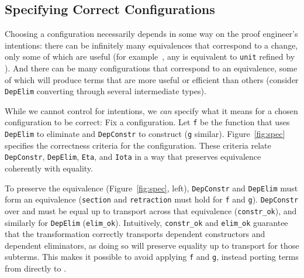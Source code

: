 \subsection{Specifying Correct Configurations}
\label{sec:art}


Choosing a configuration necessarily depends in some way on the proof engineer's intentions:
there can be infinitely many equivalences that correspond to a 
change, only some of which are useful (for example~, any \A is equivalent to \lstinline{unit} refined by \A). %
And there can be many configurations that correspond
to an equivalence, some of which will produce terms that are more useful or efficient than others
(consider \lstinline{DepElim} converting through several intermediate types).

While we cannot control for intentions, we \textit{can} specify what it means for a chosen configuration to be correct:
Fix a configuration. Let \lstinline{f} be the function that uses \lstinline{DepElim} to eliminate \A and \lstinline{DepConstr} to construct \B (\lstinline{g} similar). %
Figure~\ref{fig:spec} specifies the correctness criteria for the configuration.
These criteria relate \lstinline{DepConstr}, \lstinline{DepElim}, \lstinline{Eta}, and \lstinline{Iota}
in a way that preserves equivalence coherently with equality.

To preserve the equivalence (Figure~\ref{fig:spec}, left), \lstinline{DepConstr} and \lstinline{DepElim} must form an equivalence
(\lstinline{section} and \lstinline{retraction} must hold for \lstinline{f} and \lstinline{g}).
\lstinline{DepConstr} over \A and \B must be equal up to transport across that equivalence (\lstinline{constr_ok}), 
and similarly for \lstinline{DepElim} (\lstinline{elim_ok}).
Intuitively, \lstinline{constr_ok} and \lstinline{elim_ok} guarantee that the transformation
correctly transports dependent constructors and dependent eliminators,
as doing so will preserve equality up to transport for those subterms.
This makes it possible %
to avoid applying \lstinline{f} and \lstinline{g}, instead porting terms from \A directly to \B.

